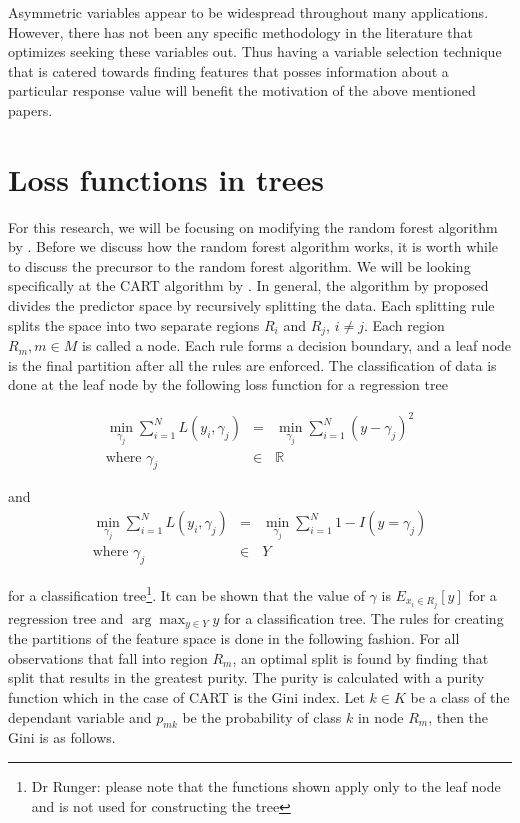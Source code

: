 \documentclass[twoside,11pt]{article}
\begin{document}
Asymmetric variables appear to be widespread throughout many applications. However, there  has not been any specific methodology in the literature that optimizes seeking these variables out. Thus having a variable selection technique that is catered towards finding features that posses information about a particular response value will benefit the motivation of the above mentioned papers. 

\section{Loss functions in trees}
For this research, we will be focusing on modifying the random forest algorithm by \citet{Breiman01}. Before we discuss how the random forest algorithm works, it is worth while to discuss the precursor to the random forest algorithm. We will be looking specifically at the CART algorithm by \citet{Breiman84}. In general, the algorithm by \citet{Breiman84} proposed divides the predictor space by recursively splitting the data. Each splitting rule splits the space into two separate regions $R_i$ and $R_j$, $i \neq j$. Each region $R_m,m \in M$ is called a node. Each rule forms a decision boundary, and a leaf node is the final partition after all the rules are enforced. The classification of data is done at the leaf node by the following loss function for a regression tree

\begin{equation}
	\begin{array}{rcl}
		\min_{\gamma_j} \sum_{i=1}^N L(y_i,\gamma_j) & = &  \min_{\gamma_j} \sum_{i=1}^N (y-\gamma_j)^2 \\
	\mbox{where }	\gamma_j &\in & \mathbb{R}	
	\end{array}
\end{equation}

and 
\begin{equation}
	\begin{array}{rcl}
		 \min_{\gamma_j} \sum_{i=1}^N L(y_i,\gamma_j) & = &  \min_{\gamma_j} \sum_{i=1}^N 1-I(y=\gamma_j) \\
	\mbox{where }	\gamma_j &\in & Y
	\end{array}
\end{equation}

 
for a classification tree\footnote{Dr Runger: please note that the functions shown apply only to the leaf node and is not used for constructing the tree}. It can be shown that the value of $\gamma$ is $E_{x_i \in R_j}[y]$ for a regression tree and $\arg\max_{y\in Y} y$ for a classification tree. The rules for creating the partitions of the feature space is done in the following fashion. For all observations that fall into region $R_m$, an optimal split is found by finding that split that results in the greatest purity. The purity is calculated with a purity function which in the case of CART is the Gini index. Let $k \in K$ be a class of the dependant variable and $p_{mk}$ be the probability of class $k$ in node $R_m$, then the Gini is as follows.
\end{document}
